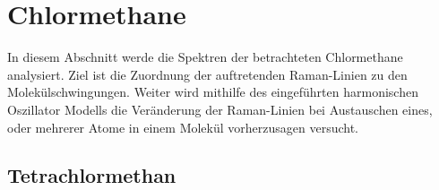 \documentclass[../bericht.tex]{subfiles}
\begin{document}
    \section{Chlormethane}

      In diesem Abschnitt werde die Spektren der betrachteten Chlormethane analysiert. Ziel ist die Zuordnung der auftretenden Raman-Linien zu den  Molekülschwingungen. Weiter wird mithilfe des eingeführten harmonischen Oszillator Modells die Veränderung der Raman-Linien bei Austauschen eines, oder mehrerer Atome in einem Molekül vorherzusagen versucht.


      \subsection{Tetrachlormethan}
      \label{subsec:tetrachlor}
\end{document}
